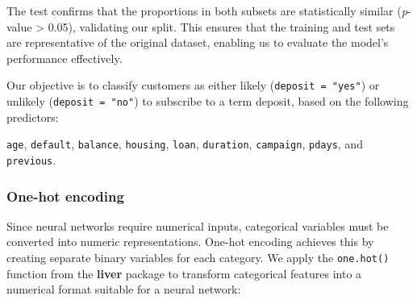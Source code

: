 \documentclass[
]{book}
\newcommand{\passthrough}[1]{#1}
\theoremstyle{definition}
\theoremstyle{definition}
\theoremstyle{definition}
\theoremstyle{definition}
\theoremstyle{remark}
\begin{document}
The test confirms that the proportions in both subsets are statistically similar (\emph{p}-value \textgreater{} 0.05), validating our split. This ensures that the training and test sets are representative of the original dataset, enabling us to evaluate the model's performance effectively.

Our objective is to classify customers as either likely (\passthrough{\lstinline!deposit = "yes"!}) or unlikely (\passthrough{\lstinline!deposit = "no"!}) to subscribe to a term deposit, based on the following predictors:

\passthrough{\lstinline!age!}, \passthrough{\lstinline!default!}, \passthrough{\lstinline!balance!}, \passthrough{\lstinline!housing!}, \passthrough{\lstinline!loan!}, \passthrough{\lstinline!duration!}, \passthrough{\lstinline!campaign!}, \passthrough{\lstinline!pdays!}, and \passthrough{\lstinline!previous!}.

\subsubsection*{One-hot encoding}\label{one-hot-encoding-3}

Since neural networks require numerical inputs, categorical variables must be converted into numeric representations. One-hot encoding achieves this by creating separate binary variables for each category. We apply the \passthrough{\lstinline!one.hot()!} function from the \textbf{liver} package to transform categorical features into a numerical format suitable for a neural network:
\end{document}

